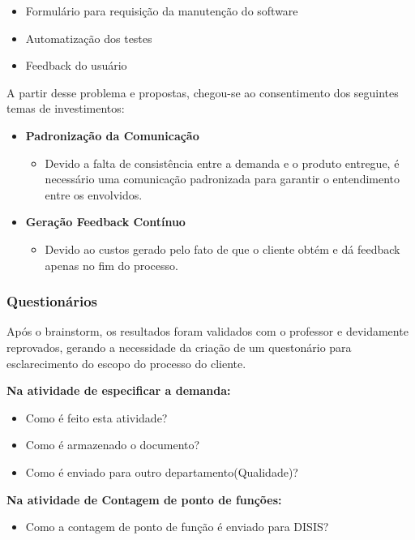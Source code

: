 \begin{itemize}
	\item Formulário para requisição da manutenção do software

	\item Automatização dos testes

	\item Feedback do usuário
\end{itemize}

A partir desse problema e propostas, chegou-se ao consentimento dos seguintes temas de investimentos:

\begin{itemize}
	\item \textbf{Padronização da Comunicação}
		\begin{itemize}
			\item Devido a falta de consistência entre a demanda e o produto entregue, é necessário uma comunicação padronizada para garantir o entendimento entre os envolvidos.
		\end{itemize}
	\item \textbf{Geração Feedback Contínuo}
		\begin{itemize}
			\item Devido ao custos gerado pelo fato de que o cliente obtém e dá feedback apenas no fim do processo.
		\end{itemize}
\end{itemize}


\subsubsection{Questionários}

Após o brainstorm, os resultados foram validados com o professor e devidamente reprovados, gerando a necessidade da criação de um questonário para esclarecimento do escopo do processo do cliente.

\textbf{Na atividade de especificar a demanda:}
\begin{itemize}
	\item Como é feito esta atividade? 
	\item Como é armazenado o documento? 
	\item Como é enviado para outro departamento(Qualidade)?
\end{itemize}

\textbf{Na atividade de Contagem de ponto de funções:}
\begin{itemize}
	\item Como a contagem de ponto de função é enviado para DISIS?
\end{itemize}

